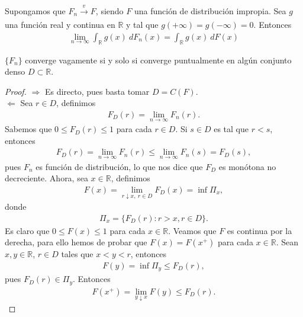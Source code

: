 \begin{teo}
    Supongamos que $F_n \xrightarrow[]{v} F$, siendo $F$ una función de distribución impropia. Sea $g$ una función real y continua en $\mathbb{R}$ y tal que $g(+\infty) = g(-\infty) = 0$. Entonces
    \begin{align*}
        \lim_{n \to \infty} \int_{\mathbb{R}} g(x) \ dF_n(x) = \int_{\mathbb{R}} g(x) \ dF(x)
    \end{align*}
\end{teo}

\begin{lema}
    $\{F_n\}$ converge vagamente si y solo si converge puntualmente en algún conjunto denso $D \subset \mathbb{R}$.
\end{lema}

\begin{proof}
    $\boxed{\Longrightarrow}$ Es directo, pues basta tomar $D = C(F)$.
    \\
    \newline
    $\boxed{\Longleftarrow}$ Sea $r \in D$, definimos
    \begin{align*}
        F_D(r) = \lim_{n \to \infty} F_n(r).
    \end{align*}
    Sabemos que $0 \leq F_D(r) \leq 1$ para cada $r \in D$. Si $s \in D$ es tal que $r < s$, entonces
    \begin{align*}
        F_D(r) = \lim_{n \to \infty} F_n(r) \leq \lim_{n \to \infty} F_n(s) = F_D(s),
    \end{align*}
    pues $F_n$ es función de distribución, lo que nos dice que $F_D$ es monótona no decreciente. Ahora, sea $x \in \mathbb{R}$, definimos
    \begin{align*}
        F(x) = \lim_{r \downarrow x, \ r \in D} F_D(x) = \inf \Pi_x,
    \end{align*}
    donde
    \begin{align*}
        \Pi_x = \{ F_D(r) : r > x, r \in D \}.
    \end{align*}
    Es claro que $0 \leq F(x) \leq 1$ para cada $x \in \mathbb{R}$. Veamos que $F$ es continua por la derecha, para ello hemos de probar que $F(x) = F(x^+)$ para cada $x \in \mathbb{R}$. Sean $x,y \in \mathbb{R}$, $r \in D$ tales que $x < y < r$, entonces
    \begin{align*}
        F(y) = \inf \Pi_y \leq F_D(r),
    \end{align*}
    pues $F_D(r) \in \Pi_y$. Entonces
    \begin{align*}
        F(x^+) = \lim_{y \downarrow x} F(y) \leq F_D(r).

\end{align*}
\end{proof}
